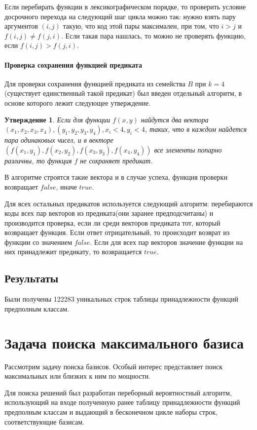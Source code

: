 \documentclass[a4paper,14pt]{extreport}
\newtheorem{utv}{Утверждение}
\begin{document}
Если перебирать функции в лексикографическом порядке, то проверить условие досрочного перехода на следующий шаг цикла можно так: нужно взять пару аргументов $(i, j)$ такую, что код этой пары максимален, при том, что $i > j$ и $f(i, j) \neq f(j, i)$. Если такая пара нашлась, то можно не проверять функцию, если $f(i, j) > f(j, i)$.

\subsubsection{Проверка сохранения функцией предиката}
Для проверки сохранения функцией предиката из семейства $B$ при $k = 4$ (существует единственный такой предикат) был введен отдельный алгоритм, в основе которого лежит следующее утверждение.

\begin{utv}
Если для функции $f(x, y)$ найдутся два вектора $(x_1, x_2, x_3, x_4), (y_1, y_2, y_3, y_4), x_i<4, y_i<4 $, таких, что в каждом найдется пара одинаковых чисел, и в векторе$(f(x_1, y_1),f(x_2, y_2),f(x_3, y_3),f(x_4, y_4))$ все элементы попарно различны, то функция $f$ не сохраняет предикат.  
\end{utv}

В алгоритме строятся такие вектора и в случае успеха, функция проверки возвращает $false$, иначе $true$.

Для всех остальных предикатов используется следующий алгоритм: перебираются коды всех пар векторов из предиката(они заранее предподсчитаны) и производится проверка, если ли среди векторов предиката тот, который возвращает функция. Если ответ отрицательный, то происходит возврат из функции со значением $false$. Если для всех пар векторов значение функции на них принадлежит предикату, то возвращается $true$. 

\section{Результаты}
Были получены 122283 уникальных строк таблицы принадлежности функций предполным классам.


\newpage
\chapter{Задача поиска максимального базиса}
Рассмотрим задачу поиска базисов. Особый интерес представляет поиск максимальных или близких к ним по мощности. 

Для поиска решений был разработан переборный вероятностный алгоритм, использующий на входе полученную ранее таблицу принадлежности функций предполным классам и выдающий в бесконечном цикле наборы строк, соответствующие базисам. 
\end{document}
